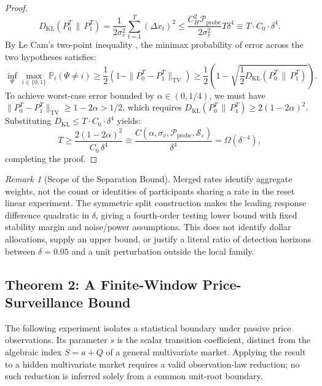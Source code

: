 \documentclass[12pt]{article}
\theoremstyle{definition}
\theoremstyle{remark}
\newtheorem{remark}[theorem]{Remark}
\begin{document}
\begin{proof}
\begin{equation}
D_{\text{KL}}\left(P_0^T \,\|\, P_1^T\right) = \frac{1}{2 \sigma_v^2} \sum_{t=1}^T \left( \Delta x_t \right)^2 \le \frac{C_H^2 \mathcal{P}_{\text{probe}}}{2 \sigma_v^2} T \delta^4 \equiv T \cdot C_0 \cdot \delta^4.
\end{equation}
By Le Cam's two-point inequality \citep{lecam1986}, the minimax probability of error across the two hypotheses satisfies:
\begin{equation}
\inf_{\Psi} \max_{i \in \{0, 1\}} \mathbb{P}_i(\Psi \neq i) \ge \frac{1}{2} \left( 1 - \|P_0^T - P_1^T\|_{\text{TV}} \right) \ge \frac{1}{2} \left( 1 - \sqrt{\frac{1}{2} D_{\text{KL}}(P_0^T \,\|\, P_1^T)} \right).
\end{equation}
To achieve worst-case error bounded by $\alpha \in (0, 1/4)$, we must have $\|P_0^T - P_1^T\|_{\text{TV}} \ge 1 - 2\alpha > 1/2$, which requires $D_{\text{KL}}(P_0^T \,\|\, P_1^T) \ge 2 (1 - 2\alpha)^2$.
Substituting $D_{\text{KL}} \le T \cdot C_0 \cdot \delta^4$ yields:
\begin{equation}
T \ge \frac{2 (1 - 2\alpha)^2}{C_0 \, \delta^4} \equiv \frac{C(\alpha,\sigma_v,\mathcal P_{\text{probe}},\mathcal S_\varepsilon)}{\delta^4} = \Omega(\delta^{-4}),
\end{equation}
completing the proof.
\end{proof}

\begin{remark}[Scope of the Separation Bound]
Merged rates identify aggregate weights, not the count or identities of participants sharing a rate in the reset linear experiment. The symmetric split construction makes the leading response difference quadratic in $\delta$, giving a fourth-order testing lower bound with fixed stability margin and noise/power assumptions. This does not identify dollar allocations, supply an upper bound, or justify a literal ratio of detection horizons between $\delta=0.05$ and a unit perturbation outside the local family.
\end{remark}


\subsection{Theorem 2: A Finite-Window Price-Surveillance Bound}
The following experiment isolates a statistical boundary under passive price observations. Its parameter $s$ is the scalar transition coefficient, distinct from the algebraic index $S=a+Q$ of a general multivariate market. Applying the result to a hidden multivariate market requires a valid observation-law reduction; no such reduction is inferred solely from a common unit-root boundary.
\end{document}
